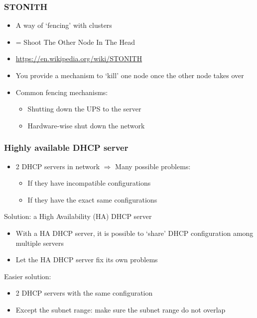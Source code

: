 \documentclass{article}
\begin{document}
\subsubsection{STONITH}

\begin{itemize}
    \item A way of `fencing' with clusters
    \item = Shoot The Other Node In The Head
    \item \url{https://en.wikipedia.org/wiki/STONITH}
    \item You provide a mechanism to `kill' one node once the other node takes over
    \item Common fencing mechanisms:
    \begin{itemize}
        \item Shutting down the UPS to the server
        \item Hardware-wise shut down the network
    \end{itemize}
\end{itemize}

\subsubsection{Highly available DHCP server}

\begin{itemize}
    \item 2 DHCP servers in network $\Rightarrow$ Many possible problems:
    \begin{itemize}
        \item If they have incompatible configurations
        \item If they have the exact same configurations
    \end{itemize}
\end{itemize}

Solution: a High Availability (HA) DHCP server

\begin{itemize}
    \item With a HA DHCP server, it is possible to `share' DHCP configuration among multiple servers
    \item Let the HA DHCP server fix its own problems 
\end{itemize}

Easier solution:

\begin{itemize}
    \item 2 DHCP servers with the same configuration
    \item Except the subnet range: make sure the subnet range do not overlap
\end{itemize}
\end{document}
